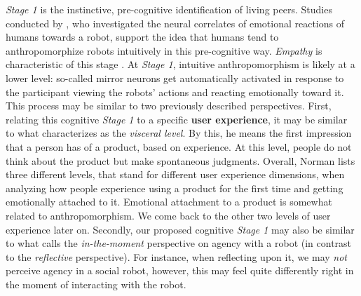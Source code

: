 \documentclass{frontiersSCNS} %
\begin{document}
\textit{Stage 1} is the instinctive, pre-cognitive identification of living peers. Studies conducted by \cite{rosenthal-vonderputten_experimental_2013}, who investigated the neural correlates of emotional reactions of humans towards a robot, support the idea that humans tend to anthropomorphize robots intuitively in this pre-cognitive way. \textit{Empathy} is characteristic of this stage \citep{rosenthalvonderPutten2013neural}. At \textit{Stage 1}, intuitive anthropomorphism is likely at a lower level: so-called mirror neurons get automatically activated in response to the participant viewing the robots' actions and reacting emotionally toward it. This process may be similar to two previously described perspectives.
First, relating this cognitive \textit{Stage 1} to a specific \textbf{user experience}, it may be similar to what \cite{norman_emotional_2003} characterizes as the \textit{visceral level}. By this, he means the first impression that a person has of a product, based on experience. At this level, people do not think about the product but make spontaneous judgments.
Overall, Norman lists three different levels, that stand for different user experience dimensions, when analyzing     how people experience using a product for the first time and getting emotionally attached to it. Emotional attachment to a product is somewhat related to anthropomorphism. We come back to the other two levels of user experience later on.
Secondly, our proposed cognitive \textit{Stage 1} may also be similar to what \cite{takayama_perspectives_2012} calls the \textit{in-the-moment} perspective on agency with a robot (in contrast to the \textit{reflective} perspective). For instance, when reflecting upon it, we may \textit{not} perceive agency in a social robot, however, this may feel quite differently right in the moment of interacting with the robot.
\end{document}
